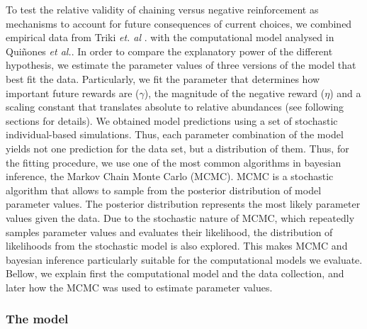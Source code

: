 \documentclass[]{rsos}%
\begin{document}
To test the relative validity of chaining versus negative reinforcement as
mechanisms to account for future consequences of current choices,
we combined empirical data from Triki \emph{et. al}
\citep{triki_Biological_2019, triki_Brain_2020}. with the computational
model analysed in Quiñones \emph{et al.}\citep{quinones_Reinforcement_2019}. In order to
compare the explanatory power of the different hypothesis, we estimate the
parameter values of three versions of the model that best fit the data.
Particularly, we fit the parameter that determines how important
future rewards are (\(\gamma\)), the magnitude of the negative reward
(\(\eta\)) and a scaling constant that translates absolute to relative
abundances (see following sections for details). We obtained model
predictions using a set of stochastic individual-based
simulations. Thus, each parameter combination of the model yields not one
prediction for the data set, but a distribution of them. Thus, for the
fitting procedure, we use one of the most common algorithms in bayesian inference,
the Markov Chain Monte Carlo (MCMC). MCMC is a stochastic algorithm that allows
to sample from the posterior distribution of model parameter values. The posterior
distribution represents the most likely parameter values given the data.
Due to the stochastic nature of MCMC, which repeatedly samples parameter values
and evaluates their likelihood, the distribution of likelihoods from the
stochastic model is also explored. This makes MCMC and bayesian inference
particularly suitable for the computational models we evaluate. Bellow,
we explain first the computational model and the data collection, and later
how the MCMC was used to estimate parameter values.

\hypertarget{the-model}{%
\subsubsection{The model}\label{the-model}}
\end{document}
